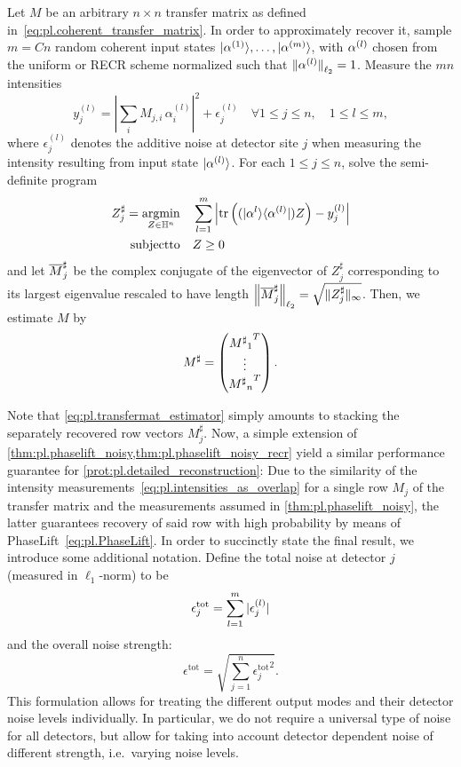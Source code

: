 \begin{protocol}%
  \label{prot:pl.detailed_reconstruction}
  Let ${M}$ be an arbitrary $n \times n$ transfer matrix as defined in~\eqref{eq:pl.coherent_transfer_matrix}.
  In order to approximately recover it, sample $m = Cn$ random coherent input states $\ket{{\alpha}^{(1)}},\ldots,\ket{{\alpha}^{(m)}}$, with $\alpha^{(l)}$ chosen from the uniform or RECR scheme normalized such that ${\Vert\alpha^{(l)}\Vert}_{\ell_2} = 1$.
  Measure the $mn$ intensities
  \[
    y_j^{(l)} = \left| \sum_i M_{j,i} \, \alpha_i^{(l)} \right|^2 + \epsilon_j^{(l)} \quad \forall 1 \leq j \leq n, \quad 1 \leq l \leq m,
  \]
  where $\epsilon_j^{(l)}$ denotes the additive noise at detector site $j$ when measuring the intensity resulting from input state  $\ket{{\alpha}^{(l)}}$.
  For each $1 \leq j \leq n$, solve the semi-definite program
  \begin{align}
    {Z}^\sharp_{j} = \underset{{Z} \in \mathbb{H}^n}{\operatorname{argmin}}& \quad \sum_{l=1}^m \left| \operatorname{tr} \left( (|{\alpha}^{l} \rangle \langle {\alpha}^{(l)} | )  Z \right) - y_j^{(l)} \right| \label{eq:tmat_recovery_program}\\
    \mathrm{subject to} & \quad {Z} \geq 0 \nonumber
  \end{align}
  and let $\overline{M}_j^\sharp$ be the complex conjugate of the eigenvector of ${Z}^\sharp_{j}$ corresponding to its largest eigenvalue rescaled to have length ${\left\Vert\overline{M}_j^\sharp\right\Vert}_{\ell_2} = \sqrt{ \| {Z}^\sharp_{j} \|_\infty}$.
  Then, we estimate ${M}$ by
  \[
    {M}^\sharp =
    \begin{pmatrix}
      {{{M^\sharp}_1}^T} \\ \vdots \\  {{{M^\sharp}_n}^T}
    \end{pmatrix}.
    \label{eq:pl.transfermat_estimator}
  \]
\end{protocol}

Note that \cref{eq:pl.transfermat_estimator} simply amounts to stacking the separately recovered row vectors $ M_j^\sharp$.
Now, a simple extension of \cref{thm:pl.phaselift_noisy,thm:pl.phaselift_noisy_recr} yield a similar performance guarantee for \cref{prot:pl.detailed_reconstruction}:
Due to the similarity of the intensity measurements~\eqref{eq:pl.intensities_as_overlap} for a single row $M_j$ of the transfer matrix and the measurements assumed in \cref{thm:pl.phaselift_noisy}, the latter guarantees recovery of said row with high probability by means of PhaseLift~\eqref{eq:pl.PhaseLift}.
In order to succinctly state the final result, we introduce some additional notation.
Define the total noise at detector $j$ (measured in $\ell_1$-norm) to be
\[
  \epsilon_j^{\mathrm{tot}}= \sum_{l=1}^m {\vert\epsilon_j^{(l)}\vert}
  \label{eq:pl.error_term_summand}
\]
and the overall noise strength:
\[
  \epsilon^{\mathrm{tot}} = \sqrt{ \sum_{j=1}^n {\epsilon_j^{\mathrm{tot}}}^2}.
\]
This formulation allows for treating the different output modes and their detector noise levels individually.
In particular, we do not require a universal type of noise for all detectors, but allow for taking into account detector dependent noise of different strength, i.e.\ varying noise levels.

